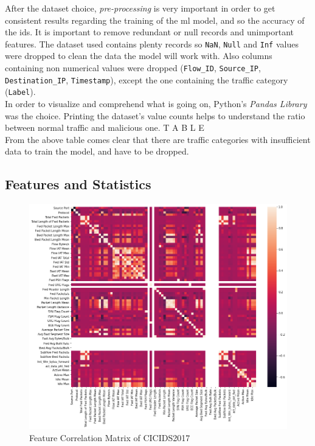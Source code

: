 After the dataset choice, \textit{pre-processing} is very important in order to get consistent results regarding the training of the \gls{ml} model, and so the accuracy of the \gls{ids}. It is important to remove redundant or null records and unimportant features. The dataset used contains plenty records so \texttt{NaN}, \texttt{Null} and \texttt{Inf} values were dropped to clean the data the model will work with. Also columns containing non numerical values were dropped (\texttt{Flow\_ID}, \texttt{Source\_IP}, \texttt{Destination\_IP}, \texttt{Timestamp}), except the one containing the traffic category (\texttt{Label}). \\ In order to visualize and comprehend what is going on, Python's \textit{Pandas Library} \cite{PandasLibrary} was the choice. Printing the dataset's value counts helps to understand the ratio between normal traffic and malicious one. T A B L E \\ From the above table comes clear that there are traffic categories with insufficient data to train the model, and have to be dropped.


\subsection{Features and Statistics}
\label{subsec:features-statistics}

\textcolor{dimgray}{\lipsum[1]}

\begin{figure}[h!]
    \centering
    \includegraphics[scale=0.5]{assets/figures/chapter3/feature-correlation.png}
    \caption{Feature Correlation Matrix of CICIDS2017}
    \label{fig:feature-correlation}
\end{figure}

